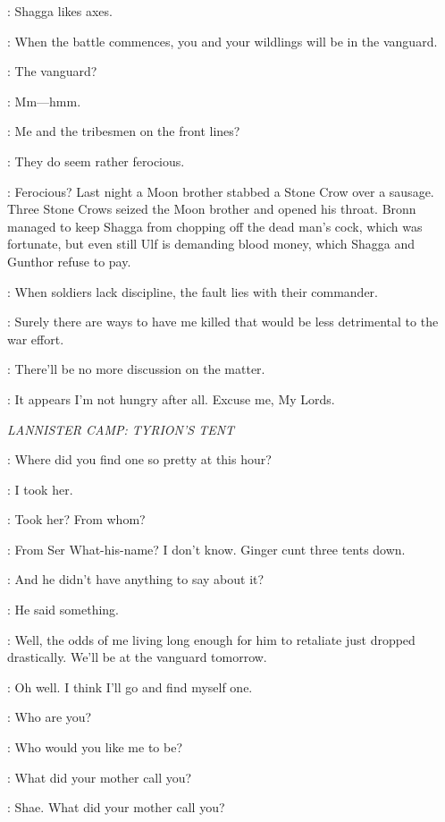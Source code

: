 \TYRION: Shagga likes axes. 

\TYWIN: When the battle commences, you and your wildlings will be in the vanguard. 

\TYRION: The vanguard? 

\TYWIN: Mm---hmm. 

\TYRION: Me and the tribesmen on the front lines? 

\KEVAN: They do seem rather ferocious. 

\TYRION: Ferocious? Last night a Moon brother stabbed a Stone Crow over a sausage. Three Stone Crows seized the Moon brother and opened his throat. Bronn managed to keep Shagga from chopping off the dead man's cock, which was fortunate, but even still Ulf is demanding blood money, which Shagga and Gunthor refuse to pay. 

\TYWIN: When soldiers lack discipline, the fault lies with their commander. 

\TYRION: Surely there are ways to have me killed that would be less detrimental to the war effort. 

\enlargethispage*{20pt}
\TYWIN: There'll be no more discussion on the matter. 

\TYRION: It appears I'm not hungry after all. Excuse me, My Lords. 

\scene

\textit{LANNISTER CAMP: TYRION'S TENT} 


\TYRION: Where did you find one so pretty at this hour? 

\BRONN: I took her. 

\TYRION: Took her? From whom? 

\BRONN: From Ser What-his-name? I don't know. Ginger cunt three tents down. 

\TYRION: And he didn't have anything to say about it? 

\BRONN: He said something. 

\TYRION: Well, the odds of me living long enough for him to retaliate just dropped drastically. We'll be at the vanguard tomorrow. 

\BRONN: Oh well. I think I'll go and find myself one. 

\TYRION: Who are you? 

\SHAE: Who would you like me to be? 

\TYRION: What did your mother call you? 

\SHAE: Shae. What did your mother call you? 


